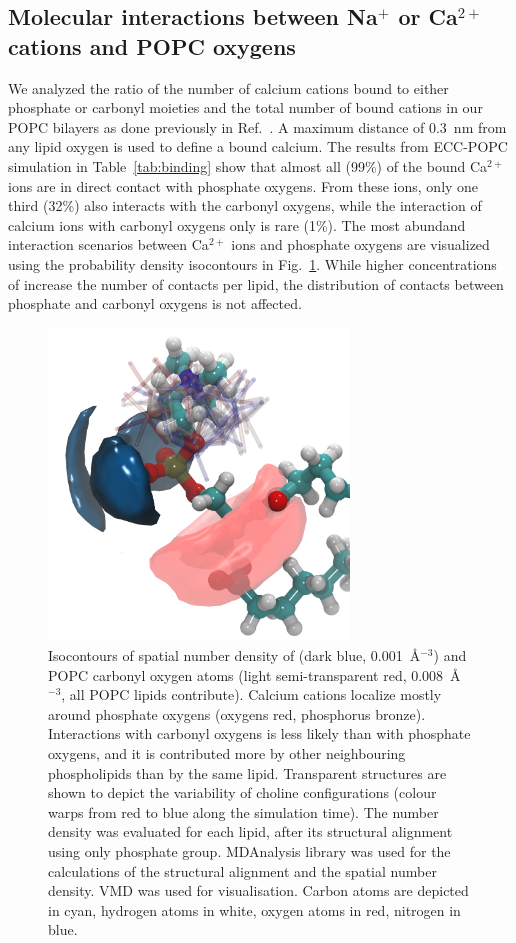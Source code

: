 \subsection{Molecular interactions between Na$^+$ or Ca$^{2+}$ cations and POPC oxygens} 
We analyzed the ratio of the number of calcium cations bound to either phosphate or carbonyl moieties and the total number of bound cations in our POPC bilayers as done previously in Ref.~\citep{javanainen17}. A maximum distance of 0.3~nm from any lipid oxygen is used to define a bound calcium. The results from ECC-POPC simulation in Table~\ref{tab:binding} show that almost all (99\%) of the bound Ca$^{2+}$ ions are in direct contact with phosphate oxygens. From these ions, only one third (32\%) also interacts with the carbonyl oxygens, while the interaction of calcium ions with carbonyl oxygens only is rare (1\%). The most abundand interaction scenarios between Ca$^{2+}$ ions and phosphate oxygens are visualized using the probability density isocontours in Fig.~\ref{fig:volmaps}. While higher concentrations of  increase the number of contacts per lipid, the distribution of contacts between phosphate and carbonyl oxygens is not affected. 
 
\begin{figure}[tb!] 
  \centering 
  \includegraphics[width=8.0cm]{../img/ecc_pops/isocontours_r37_ca_O-carb.png} 
  \caption{\label{fig:volmaps} 
    Isocontours of spatial number density of  (dark blue, 0.001~Å$^{-3}$) 
    and POPC carbonyl oxygen atoms (light semi-transparent red, 0.008~Å$^{-3}$, all POPC lipids contribute). 
    Calcium cations localize mostly around phosphate oxygens (oxygens red, phosphorus bronze).
    Interactions with carbonyl oxygens is less likely than with phosphate oxygens, 
    and it is contributed more by other neighbouring phospholipids than by the same lipid. 
    Transparent structures are shown to depict the variability of choline configurations 
    (colour warps from red to blue along the simulation time). 
    The number density was evaluated for each lipid, 
    after its structural alignment using only phosphate group.
    MDAnalysis \citep{mdanalysis2011} library was used for 
    the calculations of the structural alignment and the spatial number density. 
    VMD \citep{hump96} was used for visualisation. 
    Carbon atoms are depicted in cyan, hydrogen atoms in white, oxygen atoms in red, nitrogen in blue.
  } 
\end{figure} 
 
